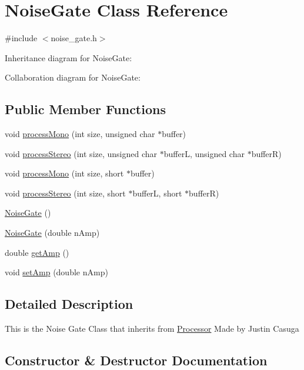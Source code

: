 \hypertarget{classNoiseGate}{}\section{Noise\+Gate Class Reference}
\label{classNoiseGate}


{\ttfamily \#include $<$noise\+\_\+gate.\+h$>$}



Inheritance diagram for Noise\+Gate\+:


Collaboration diagram for Noise\+Gate\+:
\subsection*{Public Member Functions}
\begin{DoxyCompactItemize}
\item 
void \hyperlink{classNoiseGate_ae8fd94876fcfe26528fb62df850f92f9}{process\+Mono} (int size, unsigned char $\ast$buffer)
\item 
void \hyperlink{classNoiseGate_ae8fb9a08e73fe9940c2c06c0c4613175}{process\+Stereo} (int size, unsigned char $\ast$bufferL, unsigned char $\ast$bufferR)
\item 
void \hyperlink{classNoiseGate_a8cb287300db269efcb8130a9f21d205b}{process\+Mono} (int size, short $\ast$buffer)
\item 
void \hyperlink{classNoiseGate_ab1bf83dd8cf6f0438f204b90bfad2a00}{process\+Stereo} (int size, short $\ast$bufferL, short $\ast$bufferR)
\item 
\hyperlink{classNoiseGate_ae9ccbe5934108f756ada0e492db5f71e}{Noise\+Gate} ()
\item 
\hyperlink{classNoiseGate_ad305ed6c1cd711e5a78026815f94f6c5}{Noise\+Gate} (double n\+Amp)
\item 
double \hyperlink{classNoiseGate_aa3bc6ff59a5448071d8b78ece44190e7}{get\+Amp} ()
\item 
void \hyperlink{classNoiseGate_a9fef7751dbab94fa02c897a87bed449e}{set\+Amp} (double n\+Amp)
\end{DoxyCompactItemize}


\subsection{Detailed Description}
This is the Noise Gate Class that inherits from \hyperlink{classProcessor}{Processor} Made by Justin Casuga 

\subsection{Constructor \& Destructor Documentation}
\mbox{\label{classNoiseGate_ae9ccbe5934108f756ada0e492db5f71e}} 
